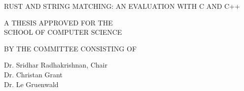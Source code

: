 \thispagestyle{empty}
\begin{center}
RUST AND STRING MATCHING: AN EVALUATION WITH C AND C++ \\

\vspace{1.0in}

A THESIS APPROVED FOR THE \\
SCHOOL OF COMPUTER SCIENCE \\

\vspace{2.0in}

BY THE COMMITTEE CONSISTING OF \\
\end{center}

\begin{flushright}
Dr. Sridhar Radhakrishnan, Chair \\
Dr. Christan Grant \\
Dr. Le Gruenwald \\

\end{flushright}

\pagebreak
